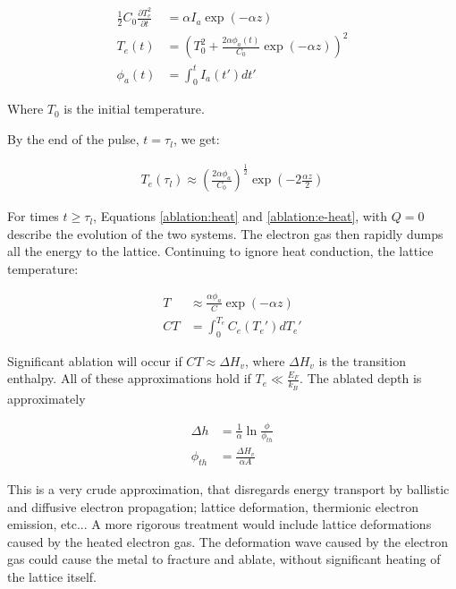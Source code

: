         \begin{align}
            \frac{1}{2}C_0\frac{\partial T_e^2}{\partial t} &= \alpha I_a \exp(-\alpha z) \\
            T_e(t) &= \left(T_0^2 + \frac{2\alpha\phi_a(t)}{C_0}\exp(-\alpha z)\right)^2 \\
            \phi_a(t) &= \int_0^t I_a(t')dt'
        \end{align}

        Where $T_0$ is the initial temperature.

        By the end of the pulse, $t = \tau_l$, we get:

        \begin{align}
            T_e(\tau_l) \approx \left(\frac{2\alpha\phi_a}{C_0}\right)^{\frac{1}{2}}\exp\left(-2\frac{\alpha z}{2}\right)
        \end{align}

        For times $t \geq \tau_l$, Equations \ref{ablation:heat} and \ref{ablation:e-heat}, with $Q = 0$ describe the evolution of the
        two systems. The electron gas then rapidly dumps all the energy to the lattice. Continuing to ignore heat conduction, the lattice
        temperature:

        \begin{align}
            T &\approx \frac{\alpha \phi_a}{C}\exp(-\alpha z) \\
            CT &= \int_0^{T_e} C_e(T_e')dT_e'
        \end{align}

        Significant ablation will occur if $CT \approx \Delta H_v$, where $\Delta H_v$ is the transition enthalpy. All of these approximations
        hold if $T_e \ll \frac{E_F}{k_B}$. The ablated depth is approximately

        \begin{align}
            \Delta h &= \frac{1}{\alpha}\ln\frac{\phi}{\phi_{th}}\\
            \phi_{th} &= \frac{\Delta H_v}{\alpha A}
        \end{align}

        This is a very crude approximation, that disregards energy transport by ballistic and diffusive electron propagation; lattice deformation,
        thermionic electron emission, etc... A more rigorous treatment would include lattice deformations caused by the heated electron gas. The
        deformation wave caused by the electron gas could cause the metal to fracture and ablate, without significant heating of the lattice itself.

